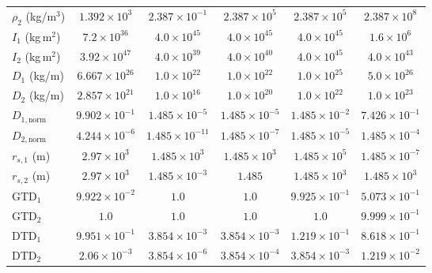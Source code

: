 \begin{table}[ht]
\begin{tabular}{@{} l c c c c c @{}}
$\rho_2$ (kg/m$^3$) & $1.392 \times 10^{3}$ & $2.387 \times 10^{-1}$ & $2.387 \times 10^{5}$ & $2.387 \times 10^{5}$ & $2.387 \times 10^{8}$ \\
$I_1$ (kg\,m$^2$) & $7.2 \times 10^{36}$ & $4.0 \times 10^{45}$ & $4.0 \times 10^{45}$ & $4.0 \times 10^{45}$ & $1.6 \times 10^{6}$ \\
$I_2$ (kg\,m$^2$) & $3.92 \times 10^{47}$ & $4.0 \times 10^{39}$ & $4.0 \times 10^{40}$ & $4.0 \times 10^{45}$ & $4.0 \times 10^{43}$ \\
$D_1$ (kg/m) & $6.667 \times 10^{26}$ & $1.0 \times 10^{22}$ & $1.0 \times 10^{22}$ & $1.0 \times 10^{25}$ & $5.0 \times 10^{26}$ \\
$D_2$ (kg/m) & $2.857 \times 10^{21}$ & $1.0 \times 10^{16}$ & $1.0 \times 10^{20}$ & $1.0 \times 10^{22}$ & $1.0 \times 10^{23}$ \\
$D_{1,\text{norm}}$ & $9.902 \times 10^{-1}$ & $1.485 \times 10^{-5}$ & $1.485 \times 10^{-5}$ & $1.485 \times 10^{-2}$ & $7.426 \times 10^{-1}$ \\
$D_{2,\text{norm}}$ & $4.244 \times 10^{-6}$ & $1.485 \times 10^{-11}$ & $1.485 \times 10^{-7}$ & $1.485 \times 10^{-5}$ & $1.485 \times 10^{-4}$ \\
$r_{s,1}$ (m) & $2.97 \times 10^{3}$ & $1.485 \times 10^{3}$ & $1.485 \times 10^{3}$ & $1.485 \times 10^{5}$ & $1.485 \times 10^{-7}$ \\
$r_{s,2}$ (m) & $2.97 \times 10^{3}$ & $1.485 \times 10^{-3}$ & $1.485$ & $1.485 \times 10^{3}$ & $1.485 \times 10^{3}$ \\
GTD$_1$ & $9.922 \times 10^{-2}$ & $1.0$ & $1.0$ & $9.925 \times 10^{-1}$ & $5.073 \times 10^{-1}$ \\
GTD$_2$ & $1.0$ & $1.0$ & $1.0$ & $1.0$ & $9.999 \times 10^{-1}$ \\
DTD$_1$ & $9.951 \times 10^{-1}$ & $3.854 \times 10^{-3}$ & $3.854 \times 10^{-3}$ & $1.219 \times 10^{-1}$ & $8.618 \times 10^{-1}$ \\
DTD$_2$ & $2.06 \times 10^{-3}$ & $3.854 \times 10^{-6}$ & $3.854 \times 10^{-4}$ & $3.854 \times 10^{-3}$ & $1.219 \times 10^{-2}$ \\
\bottomrule
\end{tabular}
\end{table}

